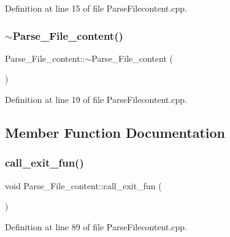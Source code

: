 Definition at line 15 of file Parse\+Filecontent.\+cpp.

\mbox{\label{class_parse___file__content_af3c8fc07e2f9a0fdafb596adbc1e167a}} 
\subsubsection{\texorpdfstring{$\sim$\+Parse\+\_\+\+File\+\_\+content()}{~Parse\_File\_content()}}
{\footnotesize\ttfamily Parse\+\_\+\+File\+\_\+content\+::$\sim$\+Parse\+\_\+\+File\+\_\+content (\begin{DoxyParamCaption}{ }\end{DoxyParamCaption})\hspace{0.3cm}{\ttfamily [virtual]}}



Definition at line 19 of file Parse\+Filecontent.\+cpp.



\subsection{Member Function Documentation}
\mbox{\label{class_parse___file__content_a87e06838393e70610ae87439c22031ff}} 
\subsubsection{\texorpdfstring{call\+\_\+exit\+\_\+fun()}{call\_exit\_fun()}}
{\footnotesize\ttfamily void Parse\+\_\+\+File\+\_\+content\+::call\+\_\+exit\+\_\+fun (\begin{DoxyParamCaption}{ }\end{DoxyParamCaption})}



Definition at line 89 of file Parse\+Filecontent.\+cpp.



